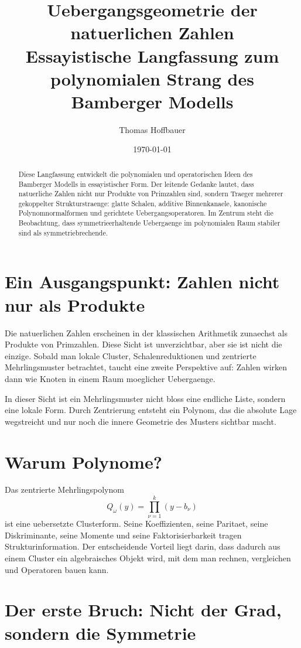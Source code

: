 \documentclass[11pt,a4paper]{article}
\title{Uebergangsgeometrie der natuerlichen Zahlen\\
\large Essayistische Langfassung zum polynomialen Strang des Bamberger Modells}
\author{Thomas Hoffbauer}
\date{\today}
\begin{document}
\maketitle

\begin{abstract}
Diese Langfassung entwickelt die polynomialen und operatorischen Ideen des Bamberger Modells in essayistischer Form. Der leitende Gedanke lautet, dass natuerliche Zahlen nicht nur Produkte von Primzahlen sind, sondern Traeger mehrerer gekoppelter Strukturstraenge: glatte Schalen, additive Binnenkanaele, kanonische Polynomnormalformen und gerichtete Uebergangsoperatoren. Im Zentrum steht die Beobachtung, dass symmetrieerhaltende Uebergaenge im polynomialen Raum stabiler sind als symmetriebrechende.
\end{abstract}

\section{Ein Ausgangspunkt: Zahlen nicht nur als Produkte}

Die natuerlichen Zahlen erscheinen in der klassischen Arithmetik zunaechst als Produkte von Primzahlen. Diese Sicht ist unverzichtbar, aber sie ist nicht die einzige. Sobald man lokale Cluster, Schalenreduktionen und zentrierte Mehrlingsmuster betrachtet, taucht eine zweite Perspektive auf: Zahlen wirken dann wie Knoten in einem Raum moeglicher Uebergaenge.

In dieser Sicht ist ein Mehrlingsmuster nicht bloss eine endliche Liste, sondern eine lokale Form. Durch Zentrierung entsteht ein Polynom, das die absolute Lage wegstreicht und nur noch die innere Geometrie des Musters sichtbar macht.

\section{Warum Polynome?}

Das zentrierte Mehrlingspolynom
\[
Q_\omega(y)=\prod_{\nu=1}^k (y-b_\nu)
\]
ist eine uebersetzte Clusterform. Seine Koeffizienten, seine Paritaet, seine Diskriminante, seine Momente und seine Faktorisierbarkeit tragen Strukturinformation. Der entscheidende Vorteil liegt darin, dass dadurch aus einem Cluster ein algebraisches Objekt wird, mit dem man rechnen, vergleichen und Operatoren bauen kann.

\section{Der erste Bruch: Nicht der Grad, sondern die Symmetrie}
\end{document}
